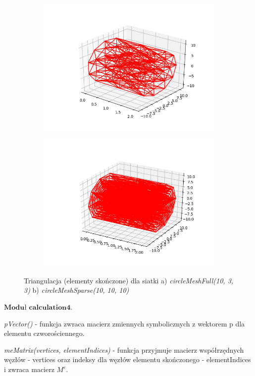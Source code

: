 \begin{figure}
\begin{subfigure}{.5\textwidth}
  \centering
  \includegraphics[width=.8\linewidth]{Zdjecia/5/triangulation1}
  \caption{}
  \label{fig:sfig1}
\end{subfigure}%
\begin{subfigure}{.5\textwidth}
  \centering
  \includegraphics[width=.8\linewidth]{Zdjecia/5/triangulation2}
  \caption{}
  \label{fig:sfig2}
\end{subfigure}

\caption{Triangulacja (elementy skończone) dla siatki a) \textit{circleMeshFull(10, 3, 3)} b) \textit{circleMeshSparse(10, 10, 10)}}
\label{fig:triangulation}
\end{figure}

\vspace {3mm}
 \( \textbf{Moduł calculation4} \).

\vspace {3mm}
\textit{pVector()} - funkcja zwraca macierz zmiennych symbolicznych z wektorem p dla elementu czworościennego.

\vspace {3mm}
\textit{meMatrix(vertices, elementIndices)} - funkcja przyjmuje macierz współrzędnych węzłów - vertices oraz indeksy dla węzłów elementu skończonego - elementIndices i zwraca macierz \( M^e \).

